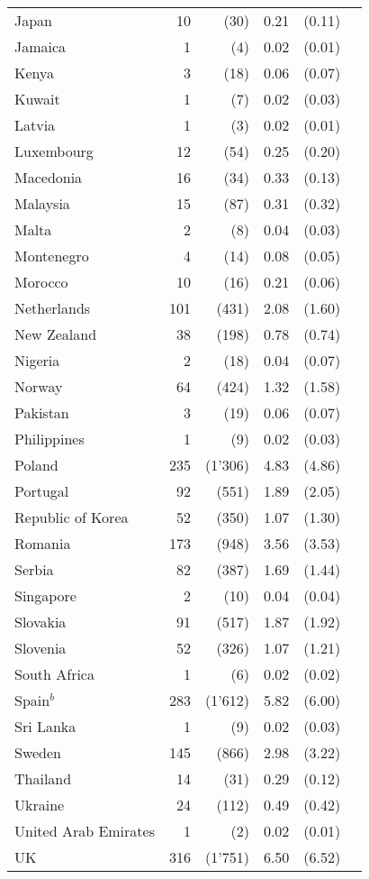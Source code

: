 \documentclass[10pt,twocolumn,oneside,cmyk]{article}
\begin{document}
\begin{table}
\begin{center}
\begin{tabularx}{\linewidth}{p{}r r r r r}
   Japan &10 &(30) &0.21 &(0.11)\\
   Jamaica &1 &(4) &0.02 &(0.01)\\
   Kenya &3 &(18) &0.06 &(0.07)\\
   Kuwait &1 &(7) &0.02 &(0.03)\\
   Latvia &1 &(3) &0.02 &(0.01)\\
   Luxembourg &12 &(54) &0.25 &(0.20)\\
   Macedonia &16 &(34) &0.33 &(0.13)\\
   Malaysia &15 &(87) &0.31 &(0.32)\\
   Malta &2 &(8) &0.04 &(0.03)\\
   Montenegro &4 &(14) &0.08 &(0.05)\\
   Morocco &10 &(16) &0.21 &(0.06)\\
   Netherlands &101 &(431) &2.08 &(1.60)\\
   New Zealand &38 &(198) &0.78 &(0.74)\\
   Nigeria &2 &(18) &0.04 &(0.07)\\
   Norway &64 &(424) &1.32 &(1.58)\\
   Pakistan &3 &(19) &0.06 &(0.07)\\
   Philippines &1 &(9) &0.02 &(0.03)\\
   Poland &235 &(1'306) &4.83 &(4.86)\\
   Portugal &92 &(551) &1.89 &(2.05)\\
   Republic of Korea &52 &(350) &1.07 &(1.30)\\
   Romania &173 &(948) &3.56 &(3.53)\\
   Serbia &82 &(387) &1.69 &(1.44)\\
   Singapore &2 &(10) &0.04 &(0.04)\\
   Slovakia &91 &(517) &1.87 &(1.92)\\
   Slovenia &52 &(326) &1.07 &(1.21)\\
   South Africa &1 &(6) &0.02 &(0.02)\\
   Spain$^b$ &283 &(1'612) &5.82 &(6.00)\\
   Sri Lanka &1 &(9) &0.02 &(0.03)\\
   Sweden &145 &(866) &2.98 &(3.22)\\
   Thailand &14 &(31) &0.29 &(0.12)\\
   Ukraine &24 &(112) &0.49 &(0.42)\\
   \scriptsize{United Arab Emirates} &1 &(2) &0.02 &(0.01)\\
   UK &316 &(1'751) &6.50 &(6.52)\\

\end{tabularx}
\end{center}
\end{table}
\end{document}
